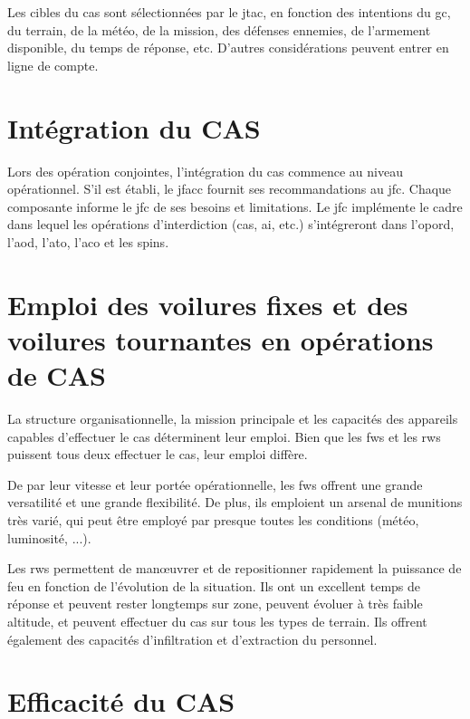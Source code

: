 	\item Les cibles du \gls{cas} sont sélectionnées par le \gls{jtac}, en fonction des intentions du \gls{gc}, du terrain, de la météo, de la mission, des défenses ennemies, de l'armement disponible, du temps de réponse, etc. D'autres considérations peuvent entrer en ligne de compte.
\ed
	
\section{Intégration du CAS}
\e
	\item Lors des opération conjointes, l'intégration du \gls{cas} commence au niveau opérationnel. S'il est établi, le \gls{jfacc} fournit ses recommandations au \gls{jfc}. Chaque composante informe le \gls{jfc} de ses besoins et limitations. Le \gls{jfc} implémente le cadre dans lequel les opérations d'interdiction (\gls{cas}, \gls{ai}, etc.) s'intégreront dans l'\gls{opord}, l'\gls{aod}, l'\gls{ato}, l'\gls{aco} et les \gls{spins}.
\ed

\section{Emploi des voilures fixes et des voilures tournantes en opérations de CAS}

\e
	\item
	La structure organisationnelle, la mission principale et les capacités des appareils capables d'effectuer le \gls{cas} déterminent leur emploi. Bien que les \glspl{fw} et les \glspl{rw} puissent tous deux effectuer le \gls{cas}, leur emploi diffère.
	
	\item
	De par leur vitesse et leur portée opérationnelle, les \glspl{fw} offrent une grande versatilité et une grande flexibilité. De plus, ils emploient un arsenal de munitions très varié, qui peut être employé par presque toutes les conditions (météo, luminosité, ...).
	
	\item
	Les \glspl{rw} permettent de manœuvrer et de repositionner rapidement la puissance de feu en fonction de l'évolution de la situation. Ils ont un excellent temps de réponse et peuvent rester longtemps sur zone, peuvent évoluer à très faible altitude, et peuvent effectuer du \gls{cas} sur tous les types de terrain. Ils offrent également des capacités d'infiltration et d'extraction du personnel.

\ed

\section{Efficacité du CAS}

